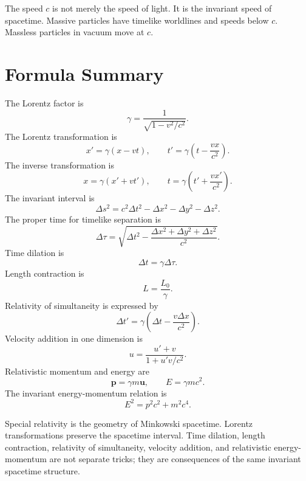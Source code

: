 The speed \(c\) is not merely the speed of light.  It is the invariant speed of
spacetime.  Massive particles have timelike worldlines and speeds below \(c\).
Massless particles in vacuum move at \(c\).

\clearpage

\section{Formula Summary}

The Lorentz factor is
\[
\gamma=\frac{1}{\sqrt{1-v^2/c^2}}.
\]
The Lorentz transformation is
\[
x'=\gamma(x-vt),
\qquad
 t'=\gamma\left(t-\frac{vx}{c^2}\right).
\]
The inverse transformation is
\[
x=\gamma(x'+vt'),
\qquad
 t=\gamma\left(t'+\frac{vx'}{c^2}\right).
\]
The invariant interval is
\[
\Delta s^2=c^2\Delta t^2-\Delta x^2-\Delta y^2-\Delta z^2.
\]
The proper time for timelike separation is
\[
\Delta\tau=\sqrt{\Delta t^2-\frac{\Delta x^2+\Delta y^2+\Delta z^2}{c^2}}.
\]
Time dilation is
\[
\Delta t=\gamma\Delta\tau.
\]
Length contraction is
\[
L=\frac{L_0}{\gamma}.
\]
Relativity of simultaneity is expressed by
\[
\Delta t'=\gamma\left(\Delta t-\frac{v\Delta x}{c^2}\right).
\]
Velocity addition in one dimension is
\[
u=\frac{u'+v}{1+u'v/c^2}.
\]
Relativistic momentum and energy are
\[
\mathbf{p}=\gamma m\mathbf{u},
\qquad
E=\gamma mc^2.
\]
The invariant energy-momentum relation is
\[
E^2=p^2c^2+m^2c^4.
\]

\begin{summarybox}
Special relativity is the geometry of Minkowski spacetime.  Lorentz
transformations preserve the spacetime interval.  Time dilation, length
contraction, relativity of simultaneity, velocity addition, and relativistic
energy-momentum are not separate tricks; they are consequences of the same
invariant spacetime structure.
\end{summarybox}
